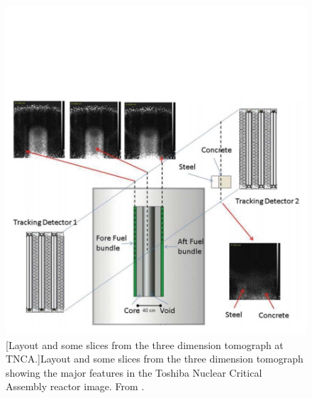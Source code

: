 \begin{figure}[!h]
\centering
\begin{minipage}{.45\textwidth}
  \centering
  \includegraphics[width=\linewidth]{Chapter5/Figs/MuTomographyExamples/Toshiba3dTomogarphy.jpg}
  [Layout and some slices from the three dimension tomograph at TNCA.]{Layout and some slices from the three dimension tomograph showing the major features in the Toshiba Nuclear Critical Assembly reactor image. From \cite{morris2014analysis}.} 
  \label{fig:Toshiba3dTomogarphy}
  \vspace{1.434cm} %
\end{minipage}%
\qquad
\begin{minipage}{.45\textwidth}
  \centering

\end{minipage}
\end{figure}

